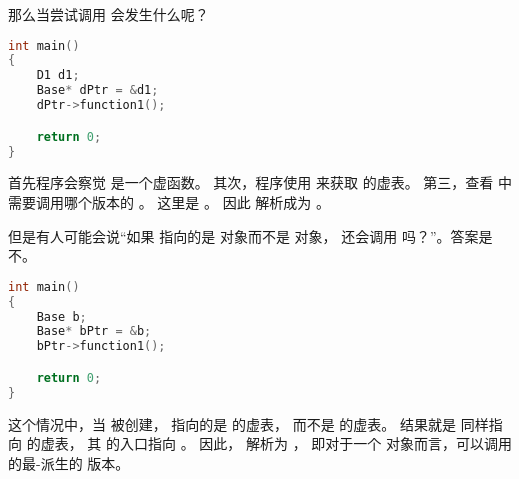 \documentclass[../../LearnCpp.tex]{subfiles}
\begin{document}
那么当尝试调用  会发生什么呢？

\begin{lstlisting}[language=C++]
int main()
{
    D1 d1;
    Base* dPtr = &d1;
    dPtr->function1();

    return 0;
}
\end{lstlisting}

首先程序会察觉  是一个虚函数。
其次，程序使用  来获取  的虚表。
第三，查看  中需要调用哪个版本的 。
这里是 。
因此  解析成为 。

但是有人可能会说“如果  指向的是  对象而不是  对象，
还会调用  吗？”。答案是不。

\begin{lstlisting}[language=C++]
int main()
{
    Base b;
    Base* bPtr = &b;
    bPtr->function1();

    return 0;
}
\end{lstlisting}

这个情况中，当  被创建， 指向的是  的虚表，
而不是  的虚表。
结果就是  同样指向  的虚表，
其  的入口指向 。
因此， 解析为 ，
即对于一个  对象而言，可以调用的最-派生的  版本。
\end{document}

